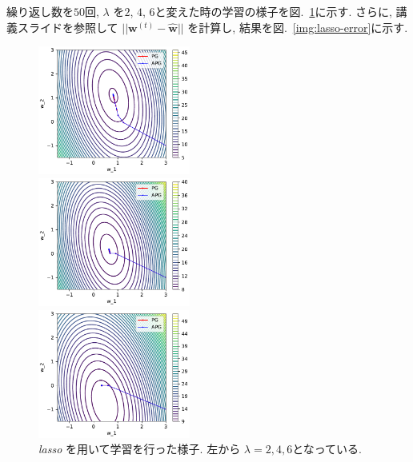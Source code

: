 \documentclass[a4paper,10pt]{jsarticle}
\begin{document}
繰り返し数を$50$回, $\lambda$ を$2$, $4$, $6$と変えた時の学習の様子を図.~\ref{img:lasso-result}に示す.
さらに, 講義スライドを参照して $||\bm{w}^{(t)} - \hat{\bm{w}}||$ を計算し,
結果を図.~\ref{img:lasso-error}に示す.


\begin{figure}[htbp]
 \begin{minipage}{0.33\hsize}
  \begin{center}
   \includegraphics[width=5cm]{figs/p2_lasso_result_lambda-2.pdf}
  \end{center}
 \end{minipage}
 \begin{minipage}{0.33\hsize}
  \begin{center}
   \includegraphics[width=5cm]{figs/p2_lasso_result_lambda-4.pdf}
  \end{center}
 \end{minipage}
 \begin{minipage}{0.33\hsize}
  \begin{center}
   \includegraphics[width=5cm]{figs/p2_lasso_result_lambda-6.pdf}
  \end{center}
 \end{minipage}
 \caption{\textit{lasso} を用いて学習を行った様子. 
 左から $\lambda=2, 4, 6$となっている.}
 \label{img:lasso-result}
\end{figure}
\end{document}

